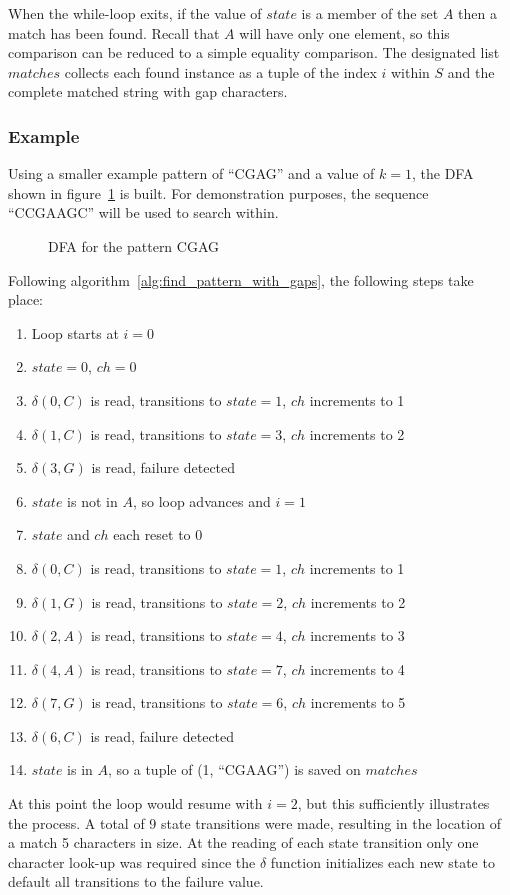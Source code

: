 When the while-loop exits, if the value of $state$ is a member of the set $A$ then a match has been found. Recall that $A$ will have only one element, so this comparison can be reduced to a simple equality comparison. The designated list $matches$ collects each found instance as a tuple of the index $i$ within $S$ and the complete matched string with gap characters.

\subsubsection{Example}

Using a smaller example pattern of ``CGAG'' and a value of $k=1$, the DFA shown in figure~\ref{fig:dfa_example} is built. For demonstration purposes, the sequence ``CCGAAGC'' will be used to search within.

\begin{figure}[ht]
\centering

\caption{DFA for the pattern CGAG}
\label{fig:dfa_example}
\end{figure}

Following algorithm~\ref{alg:find_pattern_with_gaps}, the following steps take place:

\begin{enumerate}
\item Loop starts at $i=0$
\item $state=0$, $ch=0$
\item $\delta(0,C)$ is read, transitions to $state=1$, $ch$ increments to 1
\item $\delta(1,C)$ is read, transitions to $state=3$, $ch$ increments to 2
\item $\delta(3,G)$ is read, failure detected
\item $state$ is not in $A$, so loop advances and $i=1$
\item $state$ and $ch$ each reset to 0
\item $\delta(0,C)$ is read, transitions to $state=1$, $ch$ increments to 1
\item $\delta(1,G)$ is read, transitions to $state=2$, $ch$ increments to 2
\item $\delta(2,A)$ is read, transitions to $state=4$, $ch$ increments to 3
\item $\delta(4,A)$ is read, transitions to $state=7$, $ch$ increments to 4
\item $\delta(7,G)$ is read, transitions to $state=6$, $ch$ increments to 5
\item $\delta(6,C)$ is read, failure detected
\item $state$ is in $A$, so a tuple of (1, ``CGAAG'') is saved on $matches$
\end{enumerate}

At this point the loop would resume with $i=2$, but this sufficiently illustrates the process. A total of 9 state transitions were made, resulting in the location of a match 5 characters in size. At the reading of each state transition only one character look-up was required since the $\delta$ function initializes each new state to default all transitions to the failure value.
